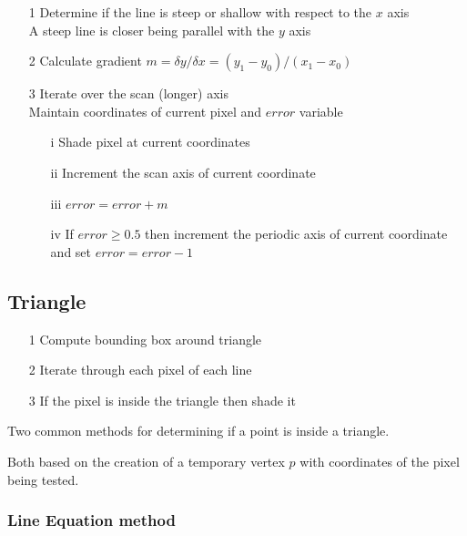 \documentclass[a4paper]{article}
\begin{document}
\begin{enumerate}
  \item[1]
    Determine if the line is steep or shallow with respect to the $x$ axis \\
    A steep line is closer being parallel with the $y$ axis

  \item[2]
    Calculate gradient $m = \delta y / \delta x = (y_{1} - y_{0}) / (x_{1} -
    x_{0})$

  \item[3]
    Iterate over the scan (longer) axis \\
    Maintain coordinates of current pixel and $error$ variable

    \begin{enumerate}
      \item[i]
        Shade pixel at current coordinates

      \item[ii]
        Increment the scan axis of current coordinate

      \item[iii]
        $error = error + m$

      \item[iv]
        If $error \geq 0.5$ then increment the periodic axis of current coordinate
        and set $error = error - 1$

    \end{enumerate}

\end{enumerate}

\subsection{Triangle}

\begin{enumerate}
  \item[1] Compute bounding box around triangle
  \item[2] Iterate through each pixel of each line
  \item[3] If the pixel is inside the triangle then shade it
\end{enumerate}

Two common methods for determining if a point is inside a triangle.

Both based on the creation of a temporary vertex $p$ with coordinates of the
pixel being tested.

\subsubsection{Line Equation method}
\end{document}
